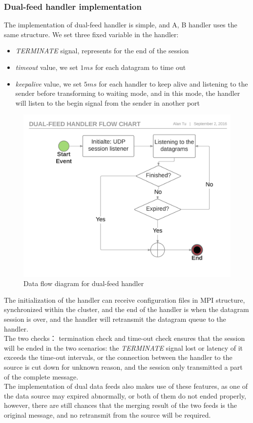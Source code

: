 \documentclass[11pt,openright,a4paper]{report}
\begin{document}
\subsubsection{Dual-feed handler implementation}
The implementation of dual-feed handler is simple, and A, B handler uses the same structure. We set three fixed variable in the handler: 
\begin{itemize}
	\item \textit{TERMINATE} signal, represents for the end of the session
	\item \textit{timeout} value, we set $1ms$ for each datagram to time out
	\item \textit{keepalive} value, we set $5ms$ for each handler to keep alive and listening to the sender before transforming to waiting mode, and in this mode, the handler will listen to the begin signal from the sender in another port
\end{itemize}
\begin{figure}[H]
\centering
\includegraphics[width=0.9\linewidth]{"picture/Dual-feed handler flow chart - Page 1"}
\caption{Data flow diagram for dual-feed handler}
\label{fig:Dual-feedhandlerflowchart-Page1}
\end{figure}
The initialization of the handler can receive configuration files in MPI structure, synchronized within the cluster, and the end of the handler is when the datagram session is over, and the handler will retransmit the datagram queue to the handler.\\
The two checks： termination check and time-out check ensures that the session will be ended in the two scenarios: the \textit{TERMINATE} signal lost or latency of it exceeds the time-out intervals, or the connection between the handler to the source is cut down for unknown reason, and the session only transmitted a part of the complete message.\\
The implementation of dual data feeds also makes use of these features, as one of the data source may expired abnormally, or both of them do not ended properly, however, there are still chances that the merging result of the two feeds is the original message, and no retransmit from the source will be required.\\
\end{document}
